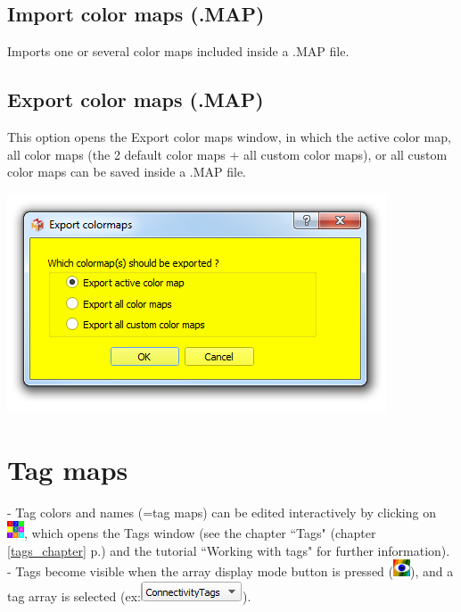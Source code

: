 \subsection{Import color maps (.MAP)}
Imports one or several color maps included inside a .MAP file. 

\subsection{Export color maps (.MAP)}

\begin{minipage}{0.55\textwidth}
This option opens the Export color maps window, in which the active color map, all color maps (the 2 default color maps + all custom color maps), or all custom color maps can be saved inside a .MAP file.


\end{minipage}  
 \begin{minipage}{0.45\textwidth}\centering
  \includegraphics[scale=0.5]{images/07/colormaps/export.png}
 \end{minipage} 


\section{Tag maps}


- Tag colors and names (=tag maps) can be edited interactively by
clicking on \includegraphics[scale=0.7]{images/07/tagmaps/tagmaps.png}, which opens the Tags window (see the chapter
``Tags" (chapter \ref{tags_chapter} p.\pageref{tags_chapter}) and the tutorial ``Working with tags" for
further information).\\
- Tags become visible when the array display mode button is pressed (\includegraphics[scale=0.7]{images/04/show_color_scale.png}), and a tag array is selected (ex:\includegraphics[scale=0.5]{images/04/scalarcombo_tag.png}).

